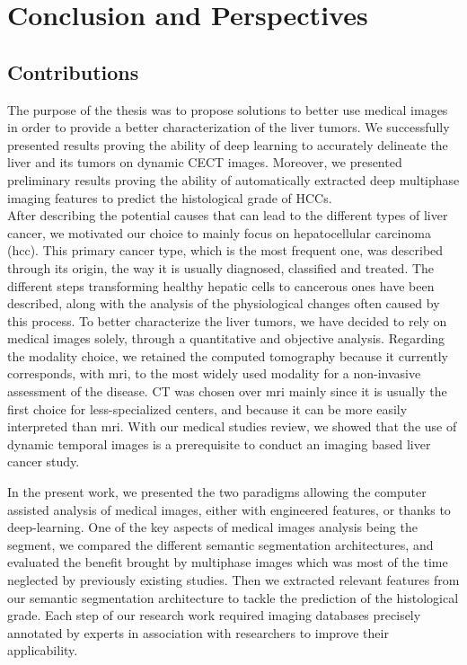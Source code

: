 \chapter*{Conclusion and Perspectives}
\label{cha:Conclusion}

\section*{Contributions}
\label{sec:ConclusionContributions}

The purpose of the thesis was to propose solutions to better use medical images in order to provide a better characterization of the liver tumors. We successfully presented results proving the ability of deep learning to accurately delineate the liver and its tumors on dynamic CECT images. Moreover, we presented preliminary results proving the ability of automatically extracted deep multiphase imaging features to predict the histological grade of HCCs.\\
After describing the potential causes that can lead to the different
types of liver cancer, we motivated our choice to mainly focus on
hepatocellular carcinoma (\ac{hcc}).
This primary cancer type, which is the most frequent one, was described
through its origin, the way it is usually diagnosed, classified and
treated.
The different steps transforming healthy hepatic cells to cancerous ones
have been described, along with the analysis of the physiological
changes often caused by this process.
To better characterize the liver tumors, we have decided to rely on
medical images solely, through a quantitative and objective analysis.
Regarding the modality choice, we retained the computed tomography
because it currently corresponds, with \ac{mri}, to the most widely used modality 
for a non-invasive assessment of the disease.
CT was chosen over \ac{mri} mainly since it is usually the first choice for
less-specialized centers, and because it can be more easily interpreted
than \ac{mri}. With our medical studies review, we showed that the use of
dynamic temporal images is a prerequisite to conduct an imaging based liver cancer
study.

In the present work, we presented the two paradigms allowing the computer
assisted analysis of medical images, either with engineered features, or
thanks to deep-learning. One of the key aspects of medical images
analysis being the segment, we compared the different semantic
segmentation architectures, and evaluated the benefit brought by
multiphase images which was most of the time neglected by previously
existing studies. Then we extracted relevant features from our semantic
segmentation architecture to tackle the prediction of the histological
grade. Each step of our research work required imaging databases
precisely annotated by experts in association with researchers to
improve their applicability.

